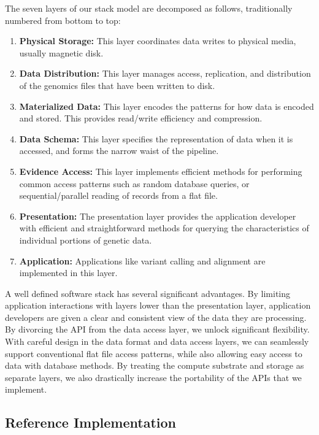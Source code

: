 \documentclass{bioinfo}
\begin{document}
The seven layers of our stack model are decomposed as follows, traditionally numbered from bottom to top:

\begin{enumerate}
\item {\bf Physical Storage:} This layer coordinates data writes to physical media, usually magnetic disk.
\item {\bf Data Distribution:} This layer manages access, replication, and distribution of the genomics files that have been written to disk.
\item {\bf Materialized Data:} This layer encodes the patterns for how data is encoded and stored. This provides read/write efficiency
and compression.
\item {\bf Data Schema:} This layer specifies the representation of data when it is accessed, and forms the narrow waist of the pipeline.
\item {\bf Evidence Access:} This layer implements efficient methods for performing common access patterns such as random database
queries, or sequential/parallel reading of records from a flat file.
\item {\bf Presentation:} The presentation layer provides the application developer with efficient and
straightforward methods for querying the characteristics of individual portions of genetic data.
\item {\bf Application:} Applications like variant calling and alignment are implemented in this layer.
\end{enumerate}

A well defined software stack has several significant advantages. By limiting application interactions with layers lower than the presentation layer,
application developers are given a clear and consistent view of the data they are processing. By divorcing the API from the data
access layer, we unlock significant flexibility. With careful design in the data format and data access layers, we can seamlessly
support conventional flat file access patterns, while also allowing easy access to data with database methods. By treating the
compute substrate and storage as separate layers, we also drastically increase the portability of the APIs that we implement. 

\subsection{Reference Implementation}
\label{sec:reference-implementation}
\end{document}
